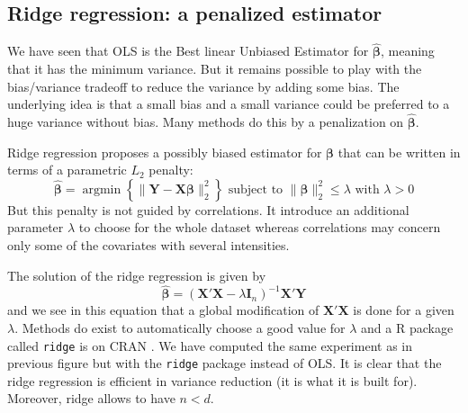 \documentclass[12pt,a4paper]{report}
\begin{document}
	\subsection{Ridge regression: a penalized estimator}
	
	We have seen that OLS is the Best linear Unbiased Estimator for $\hat{\boldsymbol{\beta}}$, meaning that it has the minimum variance. But it remains possible to play with the bias/variance tradeoff to reduce the variance by adding some bias. The underlying idea is that a small bias and a small variance could be preferred to a huge variance without bias. Many methods do this by a penalization on  $\hat{\boldsymbol{\beta}}$.  %

Ridge regression \cite{hoerl1970ridge,marquardt1975ridge} proposes a possibly biased estimator for $\boldsymbol{\beta}$ that can be written in terms of a parametric $L_2$ penalty:
	\begin{equation}
		 \boldsymbol{\hat{\beta}}=\operatorname{argmin} \left\lbrace \parallel \boldsymbol{Y}-\boldsymbol{X\beta}\parallel_2^2 \right\rbrace \textrm{ subject to } \parallel \boldsymbol{\beta} \parallel_2^2\leq \lambda \textrm{ with } \lambda>0
	\end{equation}
	But this penalty is not guided by correlations. It introduce an additional parameter $\lambda$ to choose for the whole dataset  whereas correlations may concern only some of the covariates with several intensities.
	
	The solution of the ridge regression is given by
	\begin{equation}
		 \hat{\boldsymbol{\beta}}=\left(\boldsymbol{X}'\boldsymbol{X} -\lambda\boldsymbol{I}_n\right) ^{-1}\boldsymbol{X}'\boldsymbol{Y}\label{betaridge}
	\end{equation}
	and we see in this equation that a global modification of $\boldsymbol{X}'\boldsymbol{X}$ is done for a given $\lambda$. Methods do exist to automatically choose a good value for $\lambda$ \cite{cule2013ridge,er2013systematic} and a R package called {\tt ridge} is on CRAN \cite{packageridge}. 
	We have computed the same experiment as in previous figure but with the {\tt ridge} package instead of OLS. It is clear that the ridge regression is efficient in variance reduction (it is what it is built for). Moreover, ridge allows to have $n<d$.\\
	
\end{document}
